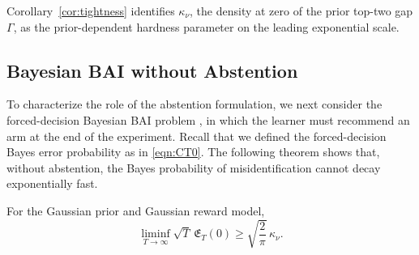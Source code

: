 \documentclass[10pt]{article}
\theoremstyle{plain}
\begin{document}
Corollary~\ref{cor:tightness} identifies \(\kappa_\nu\), the density at zero of the prior top-two gap $\Gamma$,
as the 
prior-dependent hardness parameter on the leading exponential scale. 









\subsection{Bayesian BAI without Abstention}
\label{subsec:lower-bound-no-abstention}
To characterize the role of the abstention formulation, we next consider the forced-decision  Bayesian BAI problem \citep{atsidakou2023bayesian}, in which the learner must recommend
an arm at the end of the experiment. Recall that we defined the forced-decision Bayes error probability as in \eqref{eqn:CT0}.
The following theorem shows that, without abstention, the Bayes probability of
misidentification cannot decay exponentially fast.

\begin{theorem}
\label{thm:no-abstention-lower}
For the Gaussian prior and Gaussian reward model,
\[
    \liminf_{T\to\infty}
    \sqrt T\,\mathfrak E_{T}(0)
    \ge
    \sqrt{\frac{2}{\pi}}\,\kappa_\nu.
\]
\end{theorem}
\end{document}
